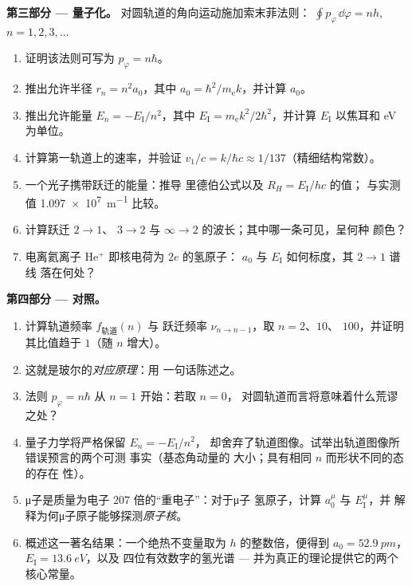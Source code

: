 \begin{problem}
\medskip\noindent\textbf{第三部分 --- 量子化。}
对圆轨道的角向运动施加索末菲法则：
$\oint p_\varphi\,\dd\varphi = nh$, $n = 1, 2, 3, \dots$
\begin{enumerate}[resume]
  \item 证明该法则可写为 $p_\varphi = n\hbar$。
  \item 推出允许半径 $r_n = n^2a_0$，其中 $a_0 =
        \hbar^2/m_{\text{e}}k$，并计算 $a_0$。
  \item 推出允许能量 $E_n = -E_{\text{I}}/n^2$，其中
        $E_{\text{I}} = m_{\text{e}}k^2/2\hbar^2$，并计算
        $E_{\text{I}}$ 以焦耳和 eV 为单位。
  \item 计算第一轨道上的速率，并验证 $v_1/c =
        k/\hbar c \approx 1/137$（精细结构常数）。
  \item 一个光子携带跃迁的能量：推导
        里德伯公式以及 $R_H = E_{\text{I}}/hc$ 的值；
        与实测值 \qty{1.097e7}{m^{-1}} 比较。
  \item 计算跃迁 $2 \to 1$、
        $3 \to 2$ 与 $\infty \to 2$ 的波长；其中哪一条可见，呈何种
        颜色？
  \item 电离氦离子 He$^+$ 即核电荷为 $2e$ 的氢原子：
        $a_0$ 与 $E_{\text{I}}$ 如何标度，其 $2 \to 1$ 谱线
        落在何处？
\end{enumerate}

\medskip\noindent\textbf{第四部分 --- 对照。}
\begin{enumerate}[resume]
  \item 计算轨道频率 $f_{\text{轨道}}(n)$ 与
        跃迁频率 $\nu_{n \to n-1}$，取 $n = 2$、$10$、
        $100$，并证明其比值趋于 $1$（随 $n$ 增大）。
  \item 这就是玻尔的\emph{对应原理}：用
        一句话陈述之。
  \item 法则 $p_\varphi = n\hbar$ 从 $n = 1$ 开始：若取 $n = 0$，
        对圆轨道而言将意味着什么荒谬之处？
  \item 量子力学将严格保留 $E_n = -E_{\text{I}}/n^2$，
        却舍弃了轨道图像。试举出轨道图像所错误预言的两个可测
        事实（基态角动量的
        大小；具有相同 $n$ 而形状不同的态的存在
        性）。
  \item μ子是质量为电子 $207$ 倍的“重电子”：对于μ子
        氢原子，计算 $a_0^\mu$ 与 $E_{\text{I}}^\mu$，并
        解释为何μ子原子能够探测\emph{原子核}。
  \item 概述这一著名结果：一个绝热不变量取为
        $h$ 的整数倍，便得到 $a_0 = \qty{52.9}{pm}$，
        $E_{\text{I}} = \qty{13.6}{eV}$，以及
        四位有效数字的氢光谱 --- 并为真正的理论提供它的两个
        核心常量。
\end{enumerate}
\end{problem}
